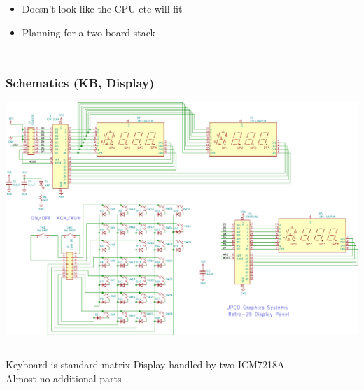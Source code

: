 \documentclass{beamer}
\newcommand{\tred}[1]{\textcolor{my-red}{#1}}
\newcommand{\tblue}[1]{\textcolor{my-blue}{#1}}
\begin{document}
\begin{frame}
\begin{columns}
    \begin{itemize}
    \scriptsize
    \item Doesn't look like the CPU etc will fit
    \item Planning for a two-board stack
    \end{itemize}
\end{columns}
  

\end{frame}


\begin{frame}
  \frametitle{Schematics (KB, Display)}  

  \vskip -0.2in
  \includegraphics[width=\textwidth]{figs/led-display-crop.pdf}

  \scriptsize
  \begin{columns}
  \tblue{Keyboard is standard matrix}
  \tred{Display handled by two ICM7218A.  \\ Almost no additional parts}
  \end{columns}
\end{frame}
\end{document}
